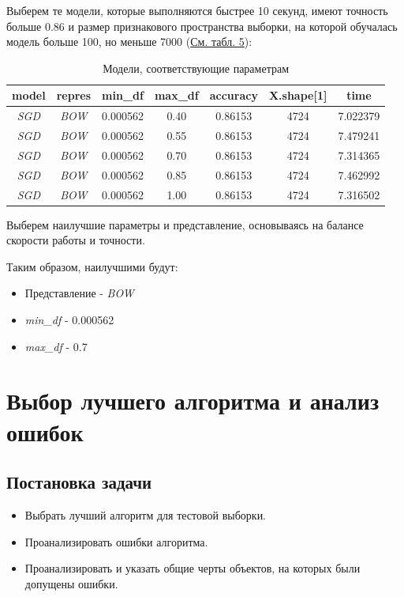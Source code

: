 \documentclass[14pt]{extarticle}
\begin{document}
Выберем те модели, которые выполняются быстрее 10 секунд, имеют точность больше 0.86 и размер признакового пространства выборки, на которой обучалась модель больше 100, но меньше 7000 (\hyperref[tab:exp_8_models_best]{См. табл. 5}):


\begin{table}[H]
    \centering
    \begin{tabular}{|c|c|c|c|c|c|c|}
        \hline
        model & repres & min\_df & max\_df & accuracy & X.shape[1] & time \\ \hline
        \textit{SGD} & \textit{BOW} & 0.000562 & 0.40 & 0.86153 & 4724 & 7.022379 \\ \hline
        \textit{SGD} & \textit{BOW} & 0.000562 & 0.55 & 0.86153 & 4724 & 7.479241 \\ \hline
        \textit{SGD} & \textit{BOW} & 0.000562 & 0.70 & 0.86153 & 4724 & 7.314365 \\ \hline
        \textit{SGD} & \textit{BOW} & 0.000562 & 0.85 & 0.86153 & 4724 & 7.462992 \\ \hline
        \textit{SGD} & \textit{BOW} & 0.000562 & 1.00 & 0.86153 & 4724 & 7.316502 \\ \hline
    \end{tabular}
    \caption{Модели, соответствующие параметрам}
    \label{tab:exp_8_models_best}
\end{table}

Выберем наилучшие параметры и представление, основываясь на балансе скорости работы и точности.

Таким образом, наилучшими будут:
\begin{itemize}
    \item Представление  - \textit{BOW}
    \item \textit{min\_df} - 0.000562
    \item \textit{max\_df} - 0.7
\end{itemize}

\section{Выбор лучшего алгоритма и анализ ошибок}

\subsection{Постановка задачи}

\begin{itemize}
    \item Выбрать лучший алгоритм для тестовой выборки.
    \item Проанализировать ошибки алгоритма.
    \item  Проанализировать и указать общие черты объектов, на которых были допущены ошибки.
\end{itemize}
\end{document}
